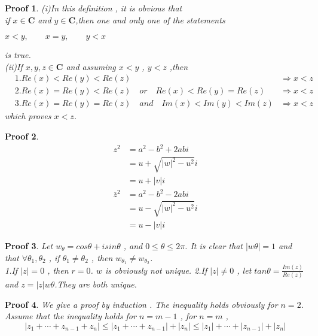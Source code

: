 \documentclass{report}
\newtheorem{myprf}{Proof}
\begin{document}
            \begin{myprf}
                (i)In this definition , it is obvious that\\
                if $x \in \mathbf{C}$ and $y \in \mathbf{C}$,then one and only one of the statements\\
                \centerline{$x<y,\qquad x=y,\qquad y<x \qquad$}
                is true.\\
                (ii)If $x,y,z \in \mathbf{C}$ and assuming $x<y$ , $y<z$ ,then
                \begin{align*}
                    &1.Re(x) < Re(y) < Re(z) &\Rightarrow x<z\\
                    &2.Re(x) = Re(y) < Re(z)\quad or \quad Re(x) < Re(y) = Re(z) &\Rightarrow x<z\\
                    &3.Re(x) = Re(y) = Re(z)\quad and \quad Im(x)<Im(y)<Im(z) &\Rightarrow x<z
                \end{align*}
                which proves $x<z$.
            \end{myprf}
            \begin{myprf}
                \begin{align*}
                    z^{2}&=a^{2}-b^{2}+2abi\\
                         &=u+\sqrt{|w|^{2}-u^2}i\\
                         &=u+|v|i
                \end{align*}
                \begin{align*}
                    \overline{z}^{2}&=a^{2}-b^{2}-2abi\\
                         &=u-\sqrt{|w|^{2}-u^2}i\\
                         &=u-|v|i
                \end{align*}
            \end{myprf}
            \begin{myprf}
                Let $w_{\theta}=cos\theta+isin\theta$ , and $0 \le \theta \le 2\pi$.
                It is clear that $|w\theta|=1$ and that $\forall\theta_{1},\theta_{2}$ , if $\theta_{1} \not=\theta_{2}$ ,
                then $w_{\theta_{1}}\not=w_{\theta_{2}}$.\\
                1.If $|z|=0$ , then $r=0$. $w$ is obviously not unique.
                2.If $|z|\not=0$ , let $tan\theta=\frac{Im(z)}{Re(z)}$ and $z=|z|w\theta$.They are both unique.
            \end{myprf}
            \begin{myprf}
                We give a proof by induction . 
                The inequality holds obviously for $n=2$.
                 Assume that the inequality holds for $n=m-1$ , 
                 for $n=m$ ,
                 \[|z_1+\cdots+z_{n-1}+z_n| \le |z_1+\cdots+z_{n-1}|+|z_n| \le |z_1|+\cdots+|z_{n-1}|+|z_n|\]
            \end{myprf}
\end{document}
